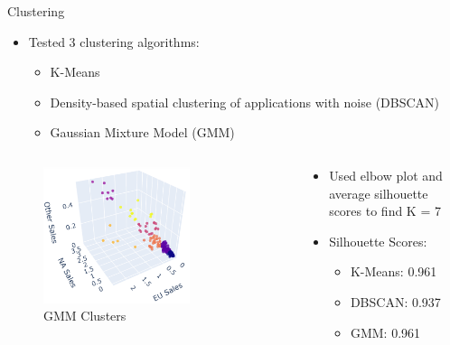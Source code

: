 \documentclass{beamer}
\begin{document}

\begin{frame}{Clustering}

\begin{itemize}
    \item Tested 3 clustering algorithms:
    \begin{itemize}
        \item K-Means
        \item Density-based spatial clustering of applications with noise (DBSCAN)
        \item Gaussian Mixture Model (GMM)
    \end{itemize}
\end{itemize}

\begin{columns}
    \begin{column}{0.5\textwidth}

        \begin{figure}
        \centering
            \includegraphics[width=0.7\textwidth]{img/gmm_scatter.png}
                \vspace{-2mm}
            \caption{GMM Clusters}
        \end{figure}

    \end{column}

    \begin{column}{0.5\textwidth}
        \begin{itemize}
        \item Used elbow plot and average silhouette scores to find K = 7
        \vspace{3mm}
            \item Silhouette Scores:
            \begin{itemize}
                \item K-Means: 0.961
                \item DBSCAN: 0.937
                \item GMM: 0.961
            \end{itemize}
        \end{itemize}
    \end{column}
\end{columns}



\end{frame}
\end{document}
